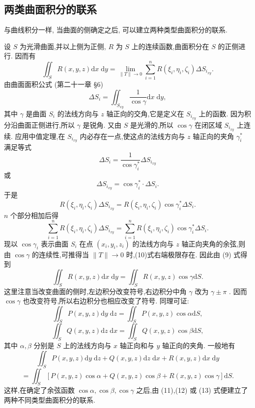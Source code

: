 \subsection{两类曲面积分的联系}

与曲线积分一样, 当曲面的侧确定之后, 可以建立两种类型曲面积分的联系.

设 \(S\) 为光滑曲面,并以上侧为正侧, \(R\) 为 \(S\) 上的连续函数,曲面积分在 \(S\) 的正侧进行. 因而有
\[
{\iint }_{S}R\left( {x,y,z}\right) \mathrm{d}x\mathrm{\;d}y = \mathop{\lim }\limits_{{\parallel T\parallel  \rightarrow  0}}\mathop{\sum }\limits_{{i = 1}}^{n}R\left( {{\xi }_{i},{\eta }_{i},{\zeta }_{i}}\right) \Delta {S}_{{i}_{xy}}. \tag{9}
\]
由曲面面积公式 (第二十一章 §6)
\[
\Delta {S}_{i} = {\iint }_{{S}_{xy}}\frac{1}{\cos \gamma }\mathrm{d}x\mathrm{\;d}y,
\]
其中 \(\gamma\) 是曲面 \({S}_{i}\) 的法线方向与 \(z\) 轴正向的交角,它是定义在 \({S}_{{i}_{xy}}\) 上的函数. 因为积分沿曲面正侧进行,所以 \(\gamma\) 是锐角. 又由 \(S\) 是光滑的,所以 \(\cos \gamma\) 在闭区域 \({S}_{{i}_{xy}}\) 上连续. 应用中值定理,在 \({S}_{{i}_{xy}}\) 内必存在一点,使这点的法线方向与 \(z\) 轴正向的夹角 \({\gamma }_{i}^{ * }\) 满足等式
\[
\Delta {S}_{i} = \frac{1}{\cos {\gamma }_{i}^{ * }}\Delta {S}_{{i}_{xy}}
\]
或
\[
\Delta {S}_{{i}_{xy}} = \cos {\gamma }_{i}^{ * } \cdot  \Delta {S}_{i}.
\]
于是
\[
R\left( {{\xi }_{i},{\eta }_{i},{\zeta }_{i}}\right) \Delta {S}_{{i}_{xy}} = R\left( {{\xi }_{i},{\eta }_{i},{\zeta }_{i}}\right) \cos {\gamma }_{i}^{ * }\Delta {S}_{i}.
\]
\(n\) 个部分相加后得
\[
\mathop{\sum }\limits_{{i = 1}}^{n}R\left( {{\xi }_{i},{\eta }_{i},{\zeta }_{i}}\right) \Delta {S}_{{i}_{xy}} = \mathop{\sum }\limits_{{i = 1}}^{n}R\left( {{\xi }_{i},{\eta }_{i},{\zeta }_{i}}\right) \cos {\gamma }_{i}^{ * }\Delta {S}_{i}. \tag{10}
\]
现以 \(\cos {\gamma }_{i}\) 表示曲面 \({S}_{i}\) 在点 \(\left( {{x}_{i},{y}_{i},{z}_{i}}\right)\) 的法线方向与 \(z\) 轴正向夹角的余弦,则由 \(\cos \gamma\) 的连续性,可推得当 \(\parallel T\parallel  \rightarrow  0\) 时,(10)式右端极限存在. 因此由 (9) 式得到
\[
{\iint }_{S}R\left( {x,y,z}\right) \mathrm{d}x\mathrm{\;d}y = {\iint }_{S}R\left( {x,y,z}\right) \cos \gamma \mathrm{d}S. \tag{11}
\]
这里注意当改变曲面的侧时,左边积分改变符号,右边积分中角 \(\gamma\) 改为 \(\gamma  \pm  \pi\) . 因而 \(\cos \gamma\) 也改变符号,所以右边积分也相应改变了符号. 同理可证:
\[
{\iint }_{S}P\left( {x,y,z}\right) \mathrm{d}y\mathrm{\;d}z = {\iint }_{S}P\left( {x,y,z}\right) \cos \alpha \mathrm{d}S, \tag{12}
\]
\[
{\iint }_{S}Q\left( {x,y,z}\right) \mathrm{d}z\mathrm{\;d}x = {\iint }_{S}Q\left( {x,y,z}\right) \cos \beta \mathrm{d}S,
\]
其中 \(\alpha ,\beta\) 分别是 \(S\) 上的法线方向与 \(x\) 轴正向和与 \(y\) 轴正向的夹角. 一般地有
\[
{\iint }_{S}P\left( {x,y,z}\right) \mathrm{d}y\mathrm{\;d}z + Q\left( {x,y,z}\right) \mathrm{d}z\mathrm{\;d}x + R\left( {x,y,z}\right) \mathrm{d}x\mathrm{\;d}y
\]
\[
= {\iint }_{S}\left\lbrack  {P\left( {x,y,z}\right) \cos \alpha  + Q\left( {x,y,z}\right) \cos \beta  + R\left( {x,y,z}\right) \cos \gamma }\right\rbrack  \mathrm{d}S. \tag{13}
\]
这样,在确定了余弦函数 \(\cos \alpha ,\cos \beta ,\cos \gamma\) 之后,由 (11),(12) 或 (13) 式便建立了两种不同类型曲面积分的联系.

